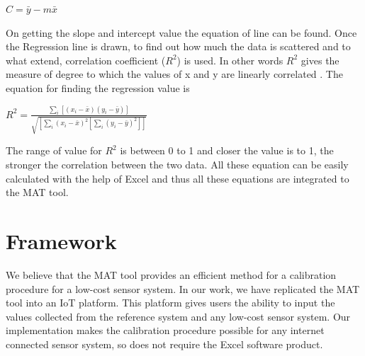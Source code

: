 \begin{center}
 
    { $ C = \bar{y}-m\bar{x}$} \cite{Stone2001} \cite{Harvey2016}

\end{center}

On getting the slope and intercept value the equation of line can be found. Once the Regression line is drawn, to find out how much the data is scattered and to what extend, correlation coefficient ($R^2$) is used. In other words $R^2$ gives the measure of  degree to which the values of x and y are linearly correlated \cite{Stone2001}. The equation for finding the regression value is

\begin{center}

    {\large $R^2 = \frac{\sum_i[(x_i-\bar x)(y_i-\bar y)]}{\sqrt{[\sum_i(x_i-\bar x)^2[\sum_i(y_i-\bar y)^2]]}}$ } \cite{Stone2001}

\end{center}
The range of value for $R^2$ is between 0 to 1 and closer the value is to 1, the stronger the correlation between the two data.
All these equation can be easily calculated with the help of Excel and thus all these equations are integrated to the MAT tool.

\fi

\section{Framework}

We believe that the MAT tool provides an efficient method for a calibration procedure for a low-cost sensor system. In our work, we have replicated the MAT tool into an IoT platform. This platform gives users the ability to input the values collected from the reference system and any low-cost sensor system. Our implementation makes the calibration procedure possible for any internet connected sensor system, so does not require the Excel software product.

